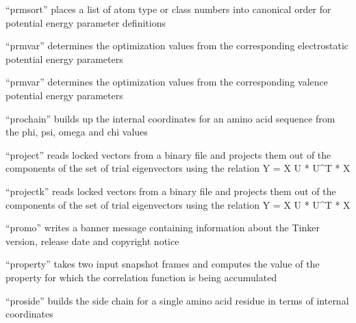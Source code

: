 \documentclass[letterpaper,11pt,english]{sphinxmanual}
\begin{document}
\sphinxAtStartPar
“prmsort” places a list of atom type or class numbers into canonical order for potential energy parameter definitions

\sphinxAtStartPar
{}

\sphinxAtStartPar
“prmvar” determines the optimization values from the corresponding electrostatic potential energy parameters

\sphinxAtStartPar
{}

\sphinxAtStartPar
“prmvar” determines the optimization values from the corresponding valence potential energy parameters

\sphinxAtStartPar
{}

\sphinxAtStartPar
“prochain” builds up the internal coordinates for an amino acid sequence from the phi, psi, omega and chi values

\sphinxAtStartPar
{}

\sphinxAtStartPar
{}

\sphinxAtStartPar
“project” reads locked vectors from a binary file and projects them out of the components of the set of trial eigenvectors using the relation Y = X \sphinxhyphen{} U * U\textasciicircum{}T * X

\sphinxAtStartPar
{}

\sphinxAtStartPar
“projectk” reads locked vectors from a binary file and projects them out of the components of the set of trial eigenvectors using the relation Y = X \sphinxhyphen{} U * U\textasciicircum{}T * X

\sphinxAtStartPar
{}

\sphinxAtStartPar
“promo” writes a banner message containing information about the Tinker version, release date and copyright notice

\sphinxAtStartPar
{}

\sphinxAtStartPar
“property” takes two input snapshot frames and computes the value of the property for which the correlation function is being accumulated

\sphinxAtStartPar
{}

\sphinxAtStartPar
“proside” builds the side chain for a single amino acid residue in terms of internal coordinates

\sphinxAtStartPar
{}
\end{document}
